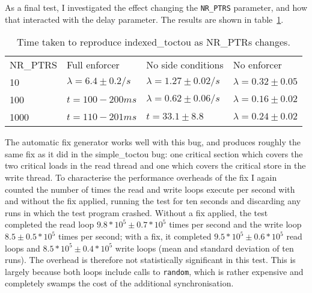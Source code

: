 As a final test, I investigated the effect changing the \verb|NR_PTRS|
parameter, and how that interacted with the delay parameter.  The
results are shown in table~\ref{table:eval:indexedtoctou:nrptrs}.



\begin{table}
\begin{tabular}{llll}
NR\_PTRS & Full enforcer             & No side conditions          & No enforcer               \\
10       & $\lambda = 6.4 \pm 0.2/s$ & $\lambda = 1.27 \pm 0.02/s$ & $\lambda = 0.32 \pm 0.05$ \\
100      & $t = 100 - 200ms$         & $\lambda = 0.62 \pm 0.06/s$ & $\lambda = 0.16 \pm 0.02$ \\
1000     & $t = 110 - 201ms$         & $t = 33.1 \pm 8.8$          & $\lambda = 0.24 \pm 0.02$ \\
\end{tabular}
\caption{Time taken to reproduce indexed\_toctou as NR\_PTRs changes.}
\label{table:eval:indexedtoctou:nrptrs}
\end{table}

The automatic fix generator works well with this bug, and produces
roughly the same fix as it did in the simple\_toctou bug: one critical
section which covers the two critical loads in the read thread and one
which covers the critical store in the write thread.  To characterise
the performance overheads of the fix I again counted the number of
times the read and write loops execute per second with and without the
fix applied, running the test for ten seconds and discarding any runs
in which the test program crashed.  Without a fix applied, the test
completed the read loop $9.8 * 10^5 \pm 0.7 * 10^5$ times per second
and the write loop $8.5 \pm 0.5 * 10^5$ times per second; with a fix,
it completed $9.5 * 10^5 \pm 0.6 * 10^5$ read loops and $8.5 * 10^5
\pm 0.4 * 10^5$ write loops (mean and standard deviation of ten runs).
The overhead is therefore not statistically significant in this test.
This is largely because both loops include calls to \verb|random|,
which is rather expensive and completely swamps the cost of the
additional synchronisation.

